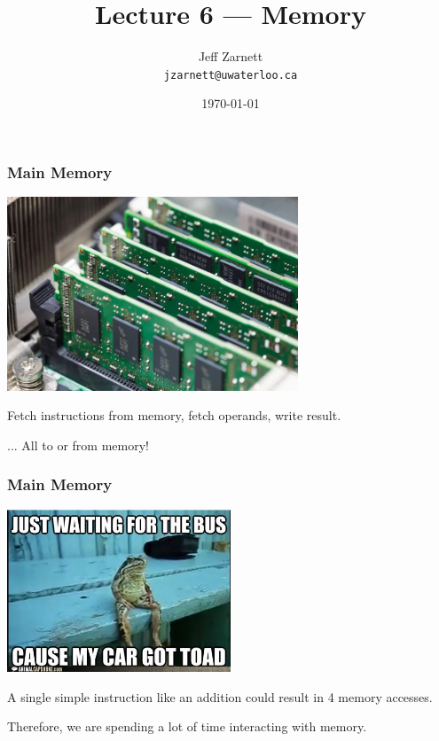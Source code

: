 

\title{Lecture 6 --- Memory }

\author{Jeff Zarnett \\ \small \texttt{jzarnett@uwaterloo.ca}}
\date{\today}




\begin{frame}
  \titlepage

 \end{frame}


\begin{frame}
\frametitle{Main Memory}

\begin{center}
	\includegraphics[width=0.65\textwidth]{images/ram.jpg}
\end{center}

Fetch instructions from memory, fetch operands, write result.

... All to or from memory!

 \end{frame}


\begin{frame}
\frametitle{Main Memory}

\begin{center}
	\includegraphics[width=0.5\textwidth]{images/waiting-for-the-bus.jpg}
\end{center}

A single simple instruction like an addition could result in 4 memory accesses. 

Therefore, we are spending a lot of time interacting with memory.


\end{frame}

